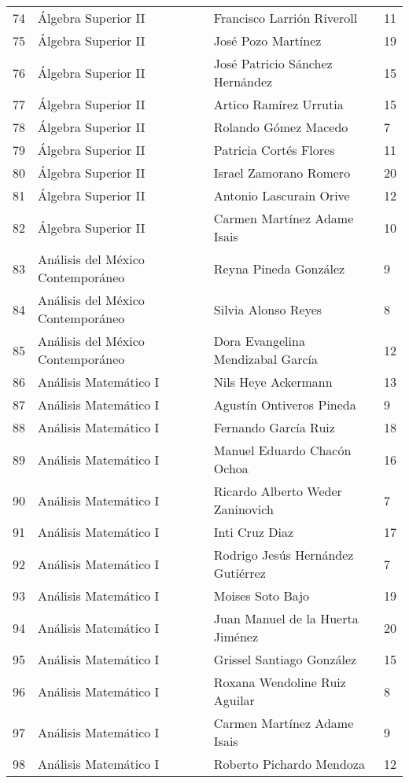 \begin{table}[ht]
\begin{tabular}{rlll}
  74 & Álgebra Superior II & Francisco Larrión Riveroll & 11 \\ 
  75 & Álgebra Superior II & José Pozo Martínez & 19 \\ 
  76 & Álgebra Superior II & José Patricio Sánchez Hernández & 15 \\ 
  77 & Álgebra Superior II & Artico Ramírez Urrutia & 15 \\ 
  78 & Álgebra Superior II & Rolando Gómez Macedo & 7 \\ 
  79 & Álgebra Superior II & Patricia Cortés Flores & 11 \\ 
  80 & Álgebra Superior II & Israel Zamorano Romero & 20 \\ 
  81 & Álgebra Superior II & Antonio Lascurain Orive & 12 \\ 
  82 & Álgebra Superior II & Carmen Martínez Adame Isais & 10 \\ 
  83 & Análisis del México Contemporáneo & Reyna Pineda González & 9 \\ 
  84 & Análisis del México Contemporáneo & Silvia Alonso Reyes & 8 \\ 
  85 & Análisis del México Contemporáneo & Dora Evangelina Mendizabal García & 12 \\ 
  86 & Análisis Matemático I & Nils Heye Ackermann & 13 \\ 
  87 & Análisis Matemático I & Agustín Ontiveros Pineda & 9 \\ 
  88 & Análisis Matemático I & Fernando García Ruiz & 18 \\ 
  89 & Análisis Matemático I & Manuel Eduardo Chacón Ochoa & 16 \\ 
  90 & Análisis Matemático I & Ricardo Alberto Weder Zaninovich & 7 \\ 
  91 & Análisis Matemático I & Inti Cruz Diaz & 17 \\ 
  92 & Análisis Matemático I & Rodrigo Jesús Hernández Gutiérrez & 7 \\ 
  93 & Análisis Matemático I & Moises Soto Bajo & 19 \\ 
  94 & Análisis Matemático I & Juan Manuel de la Huerta Jiménez & 20 \\ 
  95 & Análisis Matemático I & Grissel Santiago González & 15 \\ 
  96 & Análisis Matemático I & Roxana Wendoline Ruiz Aguilar & 8 \\ 
  97 & Análisis Matemático I & Carmen Martínez Adame Isais & 9 \\ 
  98 & Análisis Matemático I & Roberto Pichardo Mendoza & 12 \\ 

\end{tabular}
\end{table}
